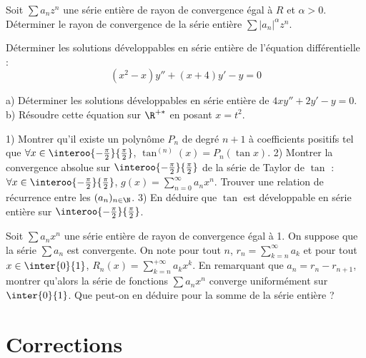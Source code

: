 \begin{exercice}
Soit $\sum a_{n}z^{n}$ une série entière de rayon de convergence égal à $R$ et $\alpha>0$. 
Déterminer le rayon de convergence de la série entière $\sum|a_{n}|^{\alpha}z^{n}$. 
\end{exercice}

\begin{exercice}
Déterminer les solutions développables en série entière de l'équation différentielle :
$$ (x^{2}-x)y''+(x+4)y'-y=0 $$ 
\end{exercice}

\begin{exercice}
a) Déterminer les solutions développables en série entière de $4xy''+2y'-y=0$. 
b) Résoudre cette équation sur $\R^{+*}$ en posant $x=t^{2}$. 
\end{exercice}

\begin{exercice}
1) Montrer qu'il existe un polynôme $P_{n}$ de degré $n+1$ à coefficients positifs tel que $\forall x\in\interoo{-\frac{\pi}{2}}{\frac{\pi}{2}}$, $\tan^{(n)}(x)=P_{n}(\tan x)$. 
2) Montrer la convergence absolue sur $\interoo{-\frac{\pi}{2}}{\frac{\pi}{2}}$ de la série de Taylor de $\tan$ : $\forall x\in\interoo{-\frac{\pi}{2}}{\frac{\pi}{2}}$, $g(x)=\sum_{n=0}^{\infty}a_{n}x^{n}$. 
Trouver une relation de récurrence entre les $(a_{n})_{n\in\N}$. 
3) En déduire que $\tan$ est développable en série entière sur $\interoo{-\frac{\pi}{2}}{\frac{\pi}{2}}$. 
\end{exercice}

\begin{exercice}
Soit $\sum a_{n}x^{n}$ une série entière de rayon de convergence égal à 1. 
On suppose que la série $\sum a_{n}$ est convergente. 
On note pour tout $n$, $r_{n}=\sum_{k=n}^{\infty}a_{k}$ et pour tout $x\in\inter{0}{1}$, $R_{n}(x)=\sum_{k=n}^{+\infty}a_{k}x^{k}$. 
En remarquant que $a_{n}=r_{n}-r_{n+1}$, montrer qu'alors la série de fonctions $\sum a_{n}x^{n}$ converge uniformément sur $\inter{0}{1}$. 
Que peut-on en déduire pour la somme de la série entière ? 
\end{exercice}


\section{Corrections}

